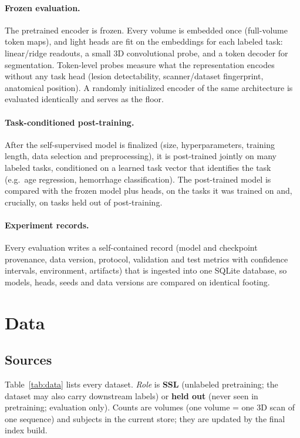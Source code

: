 \documentclass[10pt]{article}
\begin{document}
\paragraph{Frozen evaluation.} The pretrained encoder is frozen. Every volume is embedded once (full-volume token
maps), and light heads are fit on the embeddings for each labeled task: linear/ridge readouts, a small 3D
convolutional probe, and a token decoder for segmentation. Token-level probes measure what the representation
encodes without any task head (lesion detectability, scanner/dataset fingerprint, anatomical position). A
randomly initialized encoder of the same architecture is evaluated identically and serves as the floor.

\paragraph{Task-conditioned post-training.} After the self-supervised model is finalized (size, hyperparameters,
training length, data selection and preprocessing), it is post-trained jointly on many labeled tasks, conditioned on
a learned task vector that identifies the task (e.g.\ age regression, hemorrhage classification). The post-trained
model is compared with the frozen model plus heads, on the tasks it was trained on and, crucially, on tasks held out
of post-training.

\paragraph{Experiment records.} Every evaluation writes a self-contained record (model and checkpoint provenance,
data version, protocol, validation and test metrics with confidence intervals, environment, artifacts) that is
ingested into one SQLite database, so models, heads, seeds and data versions are compared on identical footing.

\section{Data}

\subsection{Sources}

Table~\ref{tab:data} lists every dataset. \emph{Role} is \textbf{SSL} (unlabeled pretraining; the dataset may also
carry downstream labels) or \textbf{held out} (never seen in pretraining; evaluation only). Counts are volumes (one
volume = one 3D scan of one sequence) and subjects in the current store; they are updated by the final index build.
\end{document}
